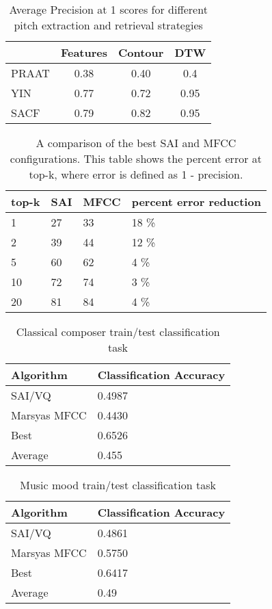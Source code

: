 \begin{table} 
\begin{center}
\caption{Average Precision at 1 scores for different pitch extraction 
and retrieval strategies} 
\begin{tabular}{|l|c|c|c|}
\hline   
              & Features & Contour & DTW \\
\hline 
PRAAT     &    0.38      &       0.40       &  0.4      \\ 
\hline 
YIN          &    0.77         &   0.72          &       0.95 \\ 
\hline 
SACF        &    0.79   &    0.82    &  0.95 \\ 
\hline 
\end{tabular} 
\label{table:dataset_prec1}
\end{center}
\end{table} 


\begin{table}
\begin{tabular}{|l|l|l|l|}
top-k & SAI & MFCC & percent error reduction \\ \hline
1 & 27 & 33 & 18 \% \\
2 & 39 & 44 & 12 \% \\
5 & 60 & 62 & 4 \% \\
10 & 72 & 74 & 3 \% \\
20 & 81 & 84 & 4 \% \\
\end{tabular}
\caption{A comparison of the best SAI and MFCC configurations.  This
  table shows the percent error at top-k, where error is defined as 1
  - precision.}
\label{table:topk}
\end{table}

\begin{table}
\centering
\begin{tabular}{|l|l|}
Algorithm & Classification Accuracy \\\hline
SAI/VQ & 0.4987 \\
Marsyas MFCC & 0.4430 \\
Best & 0.6526 \\
Average & 0.455 \\
\end{tabular}
\caption{Classical composer train/test classification task}
\label{table:classical}
\end{table}

\begin{table}
\centering
\begin{tabular}{|l|l|}
Algorithm & Classification Accuracy \\\hline
SAI/VQ &  0.4861 \\
Marsyas MFCC & 0.5750\\
Best &  0.6417 \\
Average &  0.49 \\
\end{tabular}
\caption{Music mood train/test classification task}
\label{table:mood}
\end{table}

